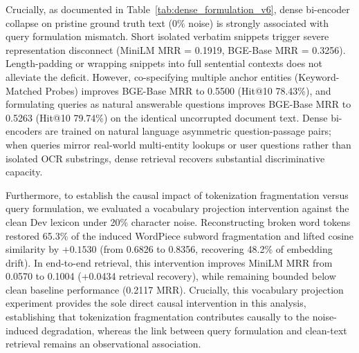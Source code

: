 \documentclass[conference]{IEEEtran}
\begin{document}
Crucially, as documented in Table~\ref{tab:dense_formulation_v6}, dense bi-encoder collapse on pristine ground truth text ($0\%$ noise) is strongly associated with query formulation mismatch. Short isolated verbatim snippets trigger severe representation disconnect (MiniLM MRR = 0.1919, BGE-Base MRR = 0.3256). Length-padding or wrapping snippets into full sentential contexts does not alleviate the deficit. However, co-specifying multiple anchor entities (Keyword-Matched Probes) improves BGE-Base MRR to 0.5500 (Hit@10 78.43\%), and formulating queries as natural answerable questions improves BGE-Base MRR to 0.5263 (Hit@10 79.74\%) on the identical uncorrupted document text. Dense bi-encoders are trained on natural language asymmetric question-passage pairs; when queries mirror real-world multi-entity lookups or user questions rather than isolated OCR substrings, dense retrieval recovers substantial discriminative capacity.

Furthermore, to establish the causal impact of tokenization fragmentation versus query formulation, we evaluated a vocabulary projection intervention against the clean Dev lexicon under 20\% character noise. Reconstructing broken word tokens restored 65.3\% of the induced WordPiece subword fragmentation and lifted cosine similarity by $+0.1530$ (from 0.6826 to 0.8356, recovering 48.2\% of embedding drift). In end-to-end retrieval, this intervention improves MiniLM MRR from 0.0570 to 0.1004 (+0.0434 retrieval recovery), while remaining bounded below clean baseline performance (0.2117 MRR). Crucially, this vocabulary projection experiment provides the sole direct causal intervention in this analysis, establishing that tokenization fragmentation contributes causally to the noise-induced degradation, whereas the link between query formulation and clean-text retrieval remains an observational association.

\begin{table}[t]
\centering\small
\caption{Dense Bi-Encoder Sensitivity to Query Formulation on Clean Ground-Truth Receipt Text ($0\%$ noise, Test $N=306$).}\label{tab:dense_formulation_v6}
\end{table}
\end{document}

